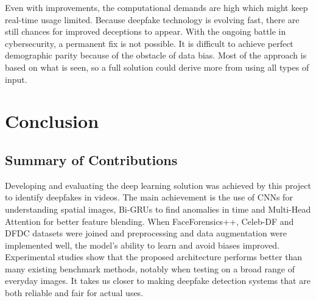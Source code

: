 \documentclass[conference]{IEEEtran}
\begin{document}
Even with improvements, the computational demands are high which might keep real-time usage limited. Because deepfake technology is evolving fast, there are still chances for improved deceptions to appear. With the ongoing battle in cybersecurity, a permanent fix is not possible. It is difficult to achieve perfect demographic parity because of the obstacle of data bias. Most of the approach is based on what is seen, so a full solution could derive more from using all types of input.

\section{Conclusion}

\subsection{Summary of Contributions}



Developing and evaluating the deep learning solution was achieved by this project to identify deepfakes in videos. The main achievement is the use of CNNs for understanding spatial images, Bi-GRUs to find anomalies in time and Multi-Head Attention for better feature blending. When FaceForensics++, Celeb-DF and DFDC datasets were joined and preprocessing and data augmentation were implemented well, the model’s ability to learn and avoid biases improved. Experimental studies show that the proposed architecture performs better than many existing benchmark methods, notably when testing on a broad range of everyday images. It takes us closer to making deepfake detection systems that are both reliable and fair for actual uses.
\end{document}
